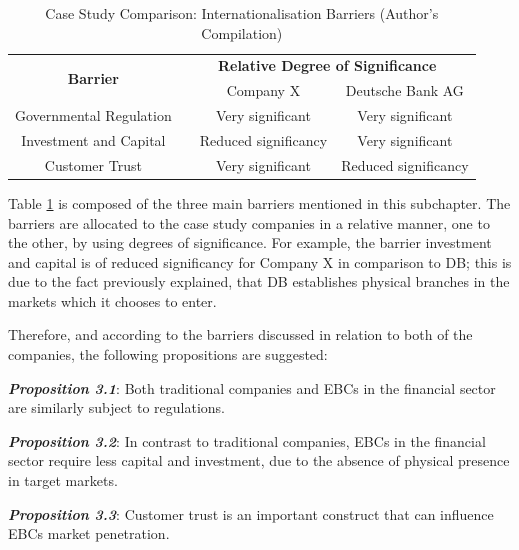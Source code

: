 \documentclass[11pt,a4paper]{article}
\begin{document}
{{{\vspace{8mm}
\begin{table}[H] \centering 
\begin{tabular}{c l c c}
    \toprule
    \multirow{2}{*}{\bfseries Barrier} & 
    \multicolumn{3}{c}{\bfseries Relative Degree of Significance}\\ \cmidrule(lr){3-4}
    && Company X&Deutsche Bank AG \\ \cmidrule(lr){1-4}
    Governmental Regulation&  & Very significant & Very significant \\
    Investment and Capital & & Reduced significancy  & Very significant\\
     Customer Trust &  & Very significant & Reduced significancy\\
    \bottomrule
\end{tabular}
\vspace{5mm}
\captionsetup{width=0.85\linewidth}
\caption{Case Study Comparison: Internationalisation Barriers (Author's Compilation)} 
\label{table:int_barriers_comp}
\end{table} 
\vspace{3mm}
Table \ref{table:int_barriers_comp} is composed of the three main barriers mentioned in this subchapter. The barriers are allocated to the case study companies in a relative manner, one to the other, by using degrees of significance. For example, the barrier investment and capital is of reduced significancy for Company X in comparison to DB; this is due to the fact previously explained, that DB establishes physical branches in the markets which it chooses to enter. \par
Therefore, and according to the barriers discussed in relation to both of the companies, the following propositions are suggested:

\begin{center}
\textbf{\textit{Proposition 3.1}}: Both traditional companies and EBCs in the financial sector are similarly subject to regulations.
\end{center}
\begin{center}
\textbf{\textit{Proposition 3.2}}: In contrast to traditional companies, EBCs in the financial sector require less capital and investment, due to the absence of physical presence in target markets.
\end{center}
\begin{center}
\textbf{\textit{Proposition 3.3}}: Customer trust is an important construct that can influence EBCs market penetration.
\end{center}

}}}
\end{document}
